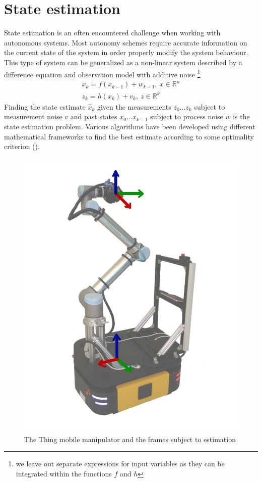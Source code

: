 \documentclass[times, utf8, diplomski, english]{fer}
\begin{document}
\chapter{State estimation}\label{chapter:State estimation}
State estimation is an often encountered challenge when working with autonomous systems.
Most autonomy schemes require accurate information on the current state of the system in order properly modify the system behaviour.
This type of system can be generalized as a non-linear system described by a difference equation and observation model with additive noise \footnote{we leave out separate expressions for input variables as they can be integrated within the functions $f$ and $h$}
\begin{subequations}\label{eq:state_space_nl}
\begin{gather}
x_k = f\left(x_{k-1}\right) + w_{k-1} , \ x \in \mathbb{R}^n \\
z_k = h\left(x_k\right) + v_k, \ z \in \mathbb{R}^k
\end{gather}
\end{subequations}
Finding the state estimate $\hat{x}_k$ given the measurements $z_0 \dots z_k$ subject to measurement noise $v$ and past states $x_0 \dots x_{k-1}$ subject to process noise $w$ is the state estimation problem.
Various algorithms have been developed using different mathematical frameworks to find the best estimate according to some optimality criterion (\cite{thrun2005probabilistic}).  
\begin{figure}[h]
\centering
\includegraphics[scale=0.4]{Thingtr}
\caption{The Thing mobile manipulator and the frames subject to estimation}
\label{figure:thing states}
\end{figure}
\end{document}
